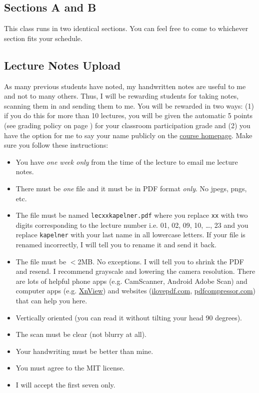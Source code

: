 \documentclass[12pt]{article}
\newcommand{\coursewebpage}{\href{https://github.com/kapelner/QC_Math_621_Fall_2020}{course homepage}}
\newcommand{\pdfcompressiontext}{I recommend  grayscale and lowering the camera resolution. There are lots of helpful phone apps (e.g. CamScanner, Android Adobe Scan) and computer apps (e.g. \href{http://www.xnconvert.com/downloads}{XnView})  and websites (\url{ilovepdf.com}, \url{pdfcompressor.com}) that can help you here.}
\begin{document}
\subsection*{Sections A and B}

This class runs in two identical sections. You can feel free to come to whichever section fits your schedule.

%

\subsection*{Lecture Notes Upload}

As many previous students have noted, my handwritten notes are useful to me and not to many others. Thus, I will be rewarding students for taking notes, scanning them in and sending them to me. You will be rewarded in two ways: (1) if you do this for more than 10 lectures, you will be given the automatic 5 points (see grading policy on page \pageref{sec:grading}) for your classroom participation grade and (2) you have the option for me to say your name publicly on the \coursewebpage. Make sure you follow these instructions:

\begin{itemize}
\item You have \emph{one week only} from the time of the lecture to email me lecture notes.
\item There must be \emph{one} file and it must be in PDF format \textit{only}. No jpegs, pngs, etc.
\item The file must be named \texttt{lecxxkapelner.pdf} where you replace \texttt{xx} with two digits corresponding to the lecture number i.e. 01, 02, 09, 10, \ldots, 23 and you replace \texttt{kapelner} with your last name in all lowercase letters. If your file is renamed incorrectly, I will tell you to rename it and send it back.
\item The file must be $<$2MB. No exceptions. I will tell you to shrink the PDF and resend. \pdfcompressiontext
\item Vertically oriented (you can read it without tilting your head 90 degrees).
\item The scan must be clear (not blurry at all).
\item Your handwriting must be better than mine.
\item You must agree to the MIT license.
\item I will accept the first seven only.
\end{itemize}
\end{document}
